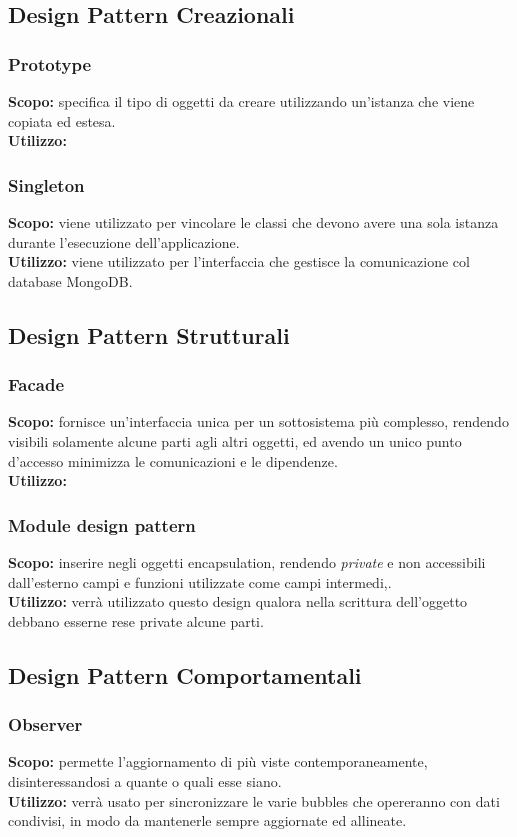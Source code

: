 \subsection{Design Pattern Creazionali}

\subsubsection{Prototype}
\textbf{Scopo:} specifica il tipo di oggetti da creare utilizzando un’istanza  che viene copiata ed estesa.\\
\textbf{Utilizzo:} 

\subsubsection{Singleton}
\textbf{Scopo:} viene utilizzato per vincolare le classi che devono avere una sola istanza durante l’esecuzione dell’applicazione.\\
\textbf{Utilizzo:} viene utilizzato per l’interfaccia che gestisce la comunicazione col database MongoDB.

\subsection{Design Pattern Strutturali}

\subsubsection{Facade}
\textbf{Scopo:} fornisce un’interfaccia unica per un sottosistema più complesso, rendendo visibili solamente alcune parti agli altri oggetti, ed avendo un unico punto d’accesso minimizza le comunicazioni e le dipendenze.\\
\textbf{Utilizzo:} 


\subsubsection{Module design pattern}
\textbf{Scopo:} inserire negli oggetti encapsulation, rendendo \textit{private} e non accessibili dall'esterno campi e funzioni utilizzate come campi intermedi,.\\
\textbf{Utilizzo:} verrà utilizzato questo design qualora nella scrittura dell'oggetto debbano esserne rese private alcune parti.

\subsection{Design Pattern Comportamentali}

\subsubsection{Observer}
\textbf{Scopo:} permette l’aggiornamento di più viste contemporaneamente, disinteressandosi a quante o quali esse siano.\\
\textbf{Utilizzo:} verrà usato per sincronizzare le varie bubbles che opereranno con dati condivisi, in modo da mantenerle sempre aggiornate ed allineate.